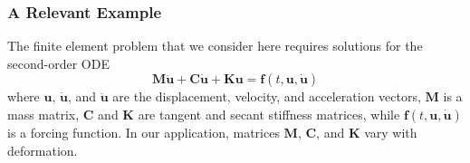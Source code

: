 \subsubsection{A Relevant Example}
\label{sec:solve2ndOrderODE}

The finite element problem that we consider here requires solutions for the second-order ODE
\begin{displaymath}
    \mathbf{M} \ddot{\mathbf{u}} + \mathbf{C} \dot{\mathbf{u}} + \mathbf{K}\mathbf{u} = \mathbf{f}( t , \mathbf{u} , \dot{\mathbf{u}} )
\end{displaymath}
where $\mathbf{u}$, $\dot{\mathbf{u}}$, and $\ddot{\mathbf{u}}$ are the displacement, velocity, and acceleration vectors, $\mathbf{M}$ is a mass matrix, $\mathbf{C}$ and $\mathbf{K}$ are tangent and secant stiffness matrices, while $\mathbf{f}( t , \mathbf{u} , \dot{\mathbf{u}} )$ is a forcing function.  In our application, matrices $\mathbf{M}$, $\mathbf{C}$, and $\mathbf{K}$ vary with deformation.

